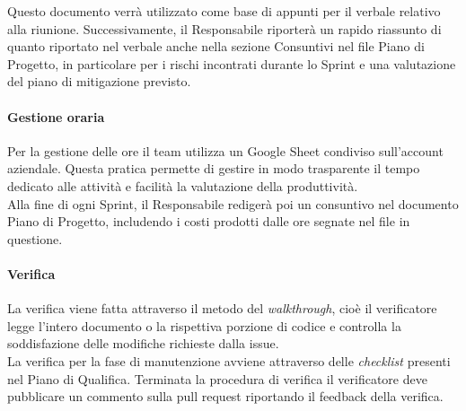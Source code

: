         \noindent
        Questo documento verrà utilizzato come base di appunti per il verbale relativo alla riunione.
        Successivamente, il Responsabile riporterà un rapido riassunto di quanto riportato nel verbale anche nella sezione Consuntivi nel file Piano di Progetto, in particolare per i rischi incontrati durante lo Sprint e una valutazione del piano di mitigazione previsto.

        \paragraph{Gestione oraria}
        Per la gestione delle ore il team utilizza un Google Sheet condiviso sull'account aziendale. Questa pratica permette di gestire in modo trasparente il tempo dedicato alle attività e facilità la valutazione della produttività.\\
        Alla fine di ogni Sprint, il Responsabile redigerà poi un consuntivo nel documento Piano di Progetto, includendo i costi prodotti dalle ore segnate nel file in questione.

        \paragraph{Verifica} \label{sec:pian-verifica}
        La verifica viene fatta attraverso il metodo del \emph{walkthrough}, cioè il verificatore legge l'intero documento o la rispettiva porzione di codice e controlla la soddisfazione delle modifiche richieste dalla issue.\\
        La verifica per la fase di manutenzione avviene attraverso delle \emph{checklist} presenti nel Piano di Qualifica. Terminata la procedura di verifica il verificatore deve pubblicare un commento sulla pull request riportando il feedback della verifica.
            
      
        